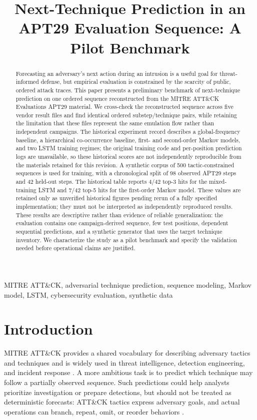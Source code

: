 \documentclass[conference]{IEEEtran}
\title{Next-Technique Prediction in an APT29 Evaluation Sequence: A Pilot Benchmark}
\author{\IEEEauthorblockN{Anonymous Submission}}
\begin{document}
\maketitle

\begin{abstract}
Forecasting an adversary's next action during an intrusion is a useful goal for threat-informed defense, but empirical evaluation is constrained by the scarcity of public, ordered attack traces. This paper presents a preliminary benchmark of next-technique prediction on one ordered sequence reconstructed from the MITRE ATT\&CK Evaluations APT29 material. We cross-check the reconstructed sequence across five vendor result files and find identical ordered substep/technique pairs, while retaining the limitation that these files represent the same emulation flow rather than independent campaigns. The historical experiment record describes a global-frequency baseline, a hierarchical co-occurrence baseline, first- and second-order Markov models, and two LSTM training regimes; the original training code and per-position prediction logs are unavailable, so these historical scores are not independently reproducible from the materials retained for this revision. A synthetic corpus of 500 tactic-constrained sequences is used for training, with a chronological split of 98 observed APT29 steps and 42 held-out steps. The historical table reports 4/42 top-3 hits for the mixed-training LSTM and 7/42 top-5 hits for the first-order Markov model. These values are retained only as unverified historical figures pending rerun of a fully specified implementation; they must not be interpreted as independently reproduced results. These results are descriptive rather than evidence of reliable generalization: the evaluation contains one campaign-derived sequence, few test positions, dependent sequential predictions, and a synthetic generator that uses the target technique inventory. We characterize the study as a pilot benchmark and specify the validation needed before operational claims are justified.
\end{abstract}

\begin{IEEEkeywords}
MITRE ATT\&CK, adversarial technique prediction, sequence modeling, Markov model, LSTM, cybersecurity evaluation, synthetic data
\end{IEEEkeywords}

\section{Introduction}
MITRE ATT\&CK provides a shared vocabulary for describing adversary tactics and techniques and is widely used in threat intelligence, detection engineering, and incident response \cite{roy2023sok}. A more ambitious task is to predict which technique may follow a partially observed sequence. Such predictions could help analysts prioritize investigation or prepare detections, but should not be treated as deterministic forecasts: ATT\&CK tactics express adversary goals, and actual operations can branch, repeat, omit, or reorder behaviors \cite{mitreTactics}.
\end{document}
